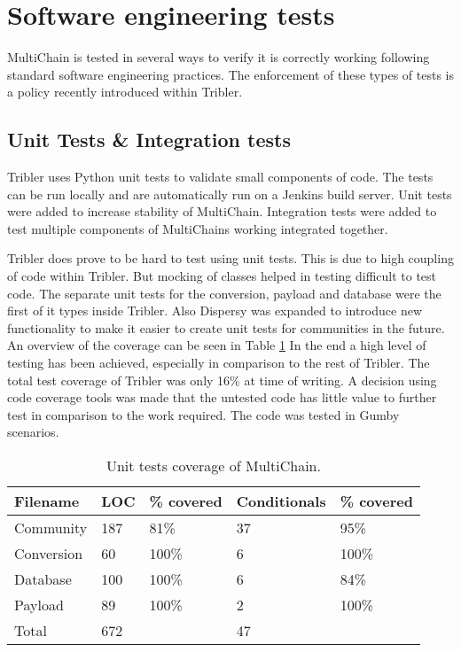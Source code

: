 \section{Software engineering tests}
MultiChain is tested in several ways to verify it is correctly working
following standard software engineering practices.
The enforcement of these types of tests is a policy recently introduced within Tribler.

\subsection{Unit Tests \& Integration tests}
Tribler uses Python unit tests to validate small components of code.
The tests can be run locally and
are automatically run on a Jenkins build server\cite{jenkins}\cite{jenkins-tribler}.
Unit tests were added to increase stability of MultiChain.
Integration tests were added to test multiple components of MultiChains working integrated together.

Tribler does prove to be hard to test using unit tests.
This is due to high coupling of code within Tribler.
But mocking of classes helped in testing difficult to test code.
The separate unit tests for the conversion, payload and database were the first of it types inside Tribler.
Also Dispersy was expanded to introduce new functionality to make it easier to create unit tests for communities in the future.
An overview of the coverage can be seen in Table \ref{tab:tests}
In the end a high level of testing has been achieved, especially in comparison to the rest of Tribler.
The total test coverage of Tribler was only 16\% at time of writing\cite{jenkins-tribler}.
A decision using code coverage tools was made that the untested code has little value to further test in comparison to the work required.
The code was tested in Gumby scenarios.

\begin{table}
\centering
\begin{tabular}{l|ll|ll}
Filename   & LOC & \% covered   & Conditionals & \% covered    \\ \hline
Community  & 187 & 81\%         & 37           & 95\%  \\
Conversion & 60  & 100\%        & 6            & 100\%  \\
Database   & 100 & 100\%        & 6            & 84\%  \\
Payload    & 89  & 100\%        & 2            & 100\% \\ \hline
Total      & 672 &              & 47           &
\end{tabular}
\caption{Unit tests coverage of MultiChain.}
\label{tab:tests}
\end{table}

